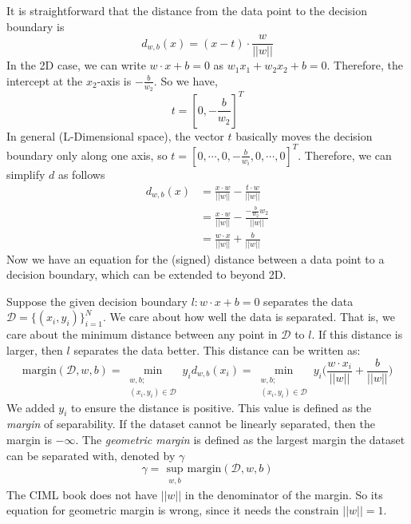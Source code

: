 \documentclass[12pt]{article}
\theoremstyle{definition}
\begin{document}
It is straightforward that the distance from the data point to the decision boundary is
\begin{equation}
  d_{w,b}(x) = (x-t)\cdot\frac{w}{||w||}
\end{equation}
In the 2D case, we can write $w\cdot x+b=0$ as $w_1x_1+w_2x_2+b=0$. Therefore, the intercept at the $x_2$-axis is $-\frac{b}{w_2}$. So we have,
\begin{equation}
  t=[0,-\frac{b}{w_2}]^T
\end{equation}
In general (L-Dimensional space), the vector $t$ basically moves the decision boundary only along one axis, so $t= [0 , \cdots, 0 , -\frac{b}{w_i} , 0 , \cdots , 0]^T$. Therefore, we can simplify $d$ as follows
\begin{align}
  d_{w,b}(x) &= \frac{x\cdot w}{||w||}-\frac{t\cdot w}{||w||}\\
  &=\frac{x\cdot w}{||w||}-\frac{-\frac{b}{w_2}w_2}{||w||}\\
  &=\frac{w\cdot x}{||w||}+\frac{b}{||w||}
\end{align}
Now we have an equation for the (signed) distance between a data point to a decision boundary, which can be extended to beyond 2D.

Suppose the given decision boundary $l:w\cdot x+b=0$ separates the data $\mathcal{D}=\{(x_i,y_i)\}_{i=1}^N$. We care about how well the data is separated. That is, we care about the minimum distance between any point in $\mathcal{D}$ to $l$. If this distance is larger, then $l$ separates the data better. This distance can be written as:
\begin{equation}
\text{margin}(\mathcal{D},w,b)=\min_{\substack{w,b;\\(x_i,y_i)\in\mathcal{D}}}y_id_{w,b}(x_i)=\min_{\substack{w,b;\\(x_i,y_i)\in\mathcal{D}}}y_i\Big(\frac{w\cdot x_i}{||w||}+\frac{b}{||w||}\Big)
\end{equation}
We added $y_i$ to ensure the distance is positive. This value is defined as the \emph{margin} of separability. If the dataset cannot be linearly separated, then the margin is $-\infty$. The \emph{geometric margin} is defined as the largest margin the dataset can be separated with, denoted by $\gamma$
\begin{equation}
\gamma=\sup_{\substack{w,b}}\text{margin}(\mathcal{D},w,b)
\end{equation}
The CIML book does not have $||w||$ in the denominator of the margin. So its equation for geometric margin is wrong, since it needs the constrain $||w||=1$.
\end{document}
